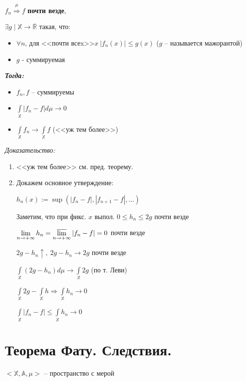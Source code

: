\documentclass[paper=a4, fontsize=17pt]{article}
\begin{document}
$f_n\stackrel{\mu}{\Rightarrow}f$ \textbf{почти везде},

$\exists g \mid \mathds{X} \rightarrow \overline{\mathds{R}}$ такая, что:
\begin{itemize}
\item
$\forall n$,  для <<почти всеx>>$x ~ |f_n(x)| \leq g(x)$ ($g$ -- называется мажорантой)
\item
$g$ - суммируемая
\end{itemize}

\emph{\textbf{Тогда:}}
\begin{itemize}
    \item $f_n, f$ -- суммируемы
    \item $\int\limits_{\mathds{X}} |f_n - f| d\mu \rightarrow 0$
    \item $\int\limits_{\mathds{X}} f_n \rightarrow \int\limits_{\mathds{X}} f$ (<<уж тем более>>)
\end{itemize}

\emph{Доказательство:}

\begin{enumerate}
	\item <<уж тем более>> см. пред. теорему.

	\item Докажем основное утверждение:

	$ h_n(x) := \sup(|f_n - f|, |f_{n+1} - f|, \dots) $

	Заметим, что при фикс. $ x $ выпол. $ 0 \leq h_n \leq 2g $ почти везде

	$ \lim\limits_{n \rightarrow +\infty} h_n =
	\varlimsup\limits_{n \rightarrow +\infty} |f_n - f| = 0 $ почти везде

	$ 2g - h_n \uparrow , ~ 2g - h_n \rightarrow 2g$ почти везде

	$ \int\limits_{\mathds{X}}(2g - h_n) d\mu \rightarrow \int\limits_{\mathds{X}} 2g $
	(по т. Леви)

	$ \int\limits_{\mathds{X}} 2g - \int\limits_{\mathds{X}} h \Rightarrow \int\limits_{\mathds{X}} h_n \rightarrow 0 $

	$ \int\limits_{\mathds{X}} |f_n - f| \leq \int\limits_{\mathds{X}} h_n \rightarrow 0 $
\end{enumerate}

\section{Теорема Фату. Следствия.}
$<\mathbb{X}, \mathbb{A}, \mu>$ -- пространство с мерой
\end{document}
